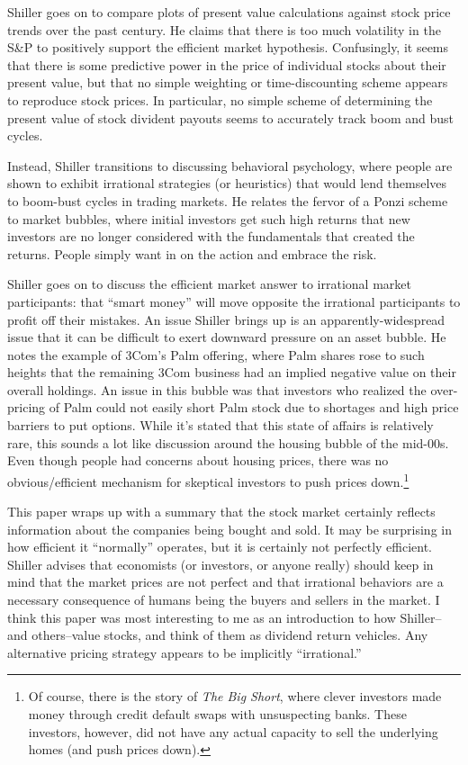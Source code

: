 Shiller goes on to compare plots of present value calculations against stock price trends over the past century.  He claims that there is too much volatility in the S\&P to positively support the efficient market hypothesis.  Confusingly, it seems that there is some predictive power in the price of individual stocks about their present value, but that no simple weighting or time-discounting scheme appears to reproduce stock prices.  In particular, no simple scheme of determining the present value of stock divident payouts seems to accurately track boom and bust cycles.

Instead, Shiller transitions to discussing behavioral psychology, where people are shown to exhibit irrational strategies (or heuristics) that would lend themselves to boom-bust cycles in trading markets.  He relates the fervor of a Ponzi scheme to market bubbles, where initial investors get such high returns that new investors are no longer considered with the fundamentals that created the returns.  People simply want in on the action and embrace the risk.

Shiller goes on to discuss the efficient market answer to irrational market participants: that ``smart money'' will move opposite the irrational participants to profit off their mistakes.  An issue Shiller brings up is an apparently-widespread issue that it can be difficult to exert downward pressure on an asset bubble.  He notes the example of 3Com's Palm offering, where Palm shares rose to such heights that the remaining 3Com business had an implied negative value on their overall holdings.  An issue in this bubble was that investors who realized the over-pricing of Palm could not easily short Palm stock due to shortages and high price barriers to put options.  While it's stated that this state of affairs is relatively rare, this sounds a lot like discussion around the housing bubble of the mid-00s.  Even though people had concerns about housing prices, there was no obvious/efficient mechanism for skeptical investors to push prices down.\footnote{Of course, there is the story of {\it The Big Short}, where clever investors made money through credit default swaps with unsuspecting banks.  These investors, however, did not have any actual capacity to sell the underlying homes (and push prices down).}

This paper wraps up with a summary that the stock market certainly reflects information about the companies being bought and sold.  It may be surprising in how efficient it ``normally'' operates, but it is certainly not perfectly efficient.  Shiller advises that economists (or investors, or anyone really) should keep in mind that the market prices are not perfect and that irrational behaviors are a necessary consequence of humans being the buyers and sellers in the market.  I think this paper was most interesting to me as an introduction to how Shiller--and others--value stocks, and think of them as dividend return vehicles.  Any alternative pricing strategy appears to be implicitly ``irrational.''


